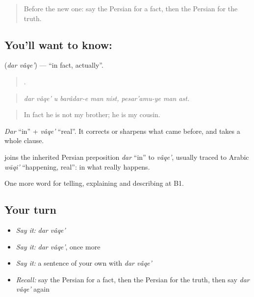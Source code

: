\label{lesson:FA-C364-dar-vaqe}



\begin{quote}
Before the new one: say the Persian for a fact, then the Persian for the truth.
\end{quote}

\subsection*{You'll want to know:  }
\textbf{ } (\emph{dar vâqe'}) — \textquotedblleft{}in fact, actually\textquotedblright{}.

\begin{quote}
        .
\end{quote}

\begin{quote}
\emph{dar vâqe' u barâdar-e man nist, pesar'amu-ye man ast.}
\end{quote}

\begin{quote}
In fact he is not my brother; he is my cousin.
\end{quote}

\emph{Dar} \textquotedblleft{}in\textquotedblright{} + \emph{vâqe'} \textquotedblleft{}real\textquotedblright{}. It corrects or sharpens what came before, and takes a whole clause.

\begin{cousinweb}
\textbf{ } joins the inherited Persian preposition \emph{dar} \textquotedblleft{}in\textquotedblright{} to \emph{vâqe'}, usually traced to Arabic \emph{wāqi'} \textquotedblleft{}happening, real\textquotedblright{}: in what really happens.
\end{cousinweb}

\begin{grammarlens}[title={What you've built}]
One more word for telling, explaining and describing at B1.
\end{grammarlens}

\subsection*{Your turn}
\begin{itemize}
\raggedright
  \item \emph{Say it:} \emph{dar vâqe'}
  \item \emph{Say it:} \emph{dar vâqe'}, once more
  \item \emph{Say it:} a sentence of your own with \emph{dar vâqe'}
  \item \emph{Recall:} say the Persian for a fact, then the Persian for the truth, then say \emph{dar vâqe'} again
\end{itemize}

